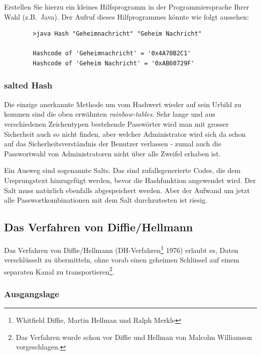 \begin{Exercise}[%
title={Hash-Code Berechnung},
label={exercise:hash-code}]

    Erstellen Sie hierzu ein kleines Hilfsprogramm in der Programmiersprache
    Ihrer Wahl (z.B.~Java). Der Aufruf dieses Hilfprogrammes könnte wie folgt aussehen:
    \begin{verbatim}
        >java Hash "Geheimnachricht" "Geheim Nachricht"

        Hashcode of 'Geheimnachricht' = '0x4A70B2C1'
        Hashcode of 'Geheim Nachricht' = '0xAB60729F'
    \end{verbatim}
\end{Exercise}


\subsubsection*{salted Hash}

Die einzige anerkannte Methode um vom Hashwert wieder auf sein Urbild
zu kommen sind die oben erwähnten \emph{rainbow-tables}. Sehr lange
und aus verschiedenen Zeichentypen bestehende Passwörter wird man
mit grosser Sicherheit auch so nicht finden, aber welcher Administrator
wird sich da schon auf das Sicherheitsverständnis der Benutzer
verlassen - zumal auch die Passwortwahl von Administratoren nicht
über alle Zweifel erhaben ist.

Ein Ausweg sind sogenannte Salts. Das sind zufallsgenerierte Codes,
die dem Ursprungstext hinzugefügt werden, bevor die Hashfunktion
angewendet wird. Der Salt muss natürlich ebenfalls abgespeichert
werden. Aber der Aufwand um jetzt alle Passwortkombinationen mit
dem Salt durchzutesten ist riesig.

\subsection{Das Verfahren von Diffie/Hellmann}
\label{subsec:diffie-hellmann}


Das Verfahren von Diffie/Hellmann (DH-Verfahren\footnote{Whitfield Diffie,
Martin Hellman und Ralph Merkle} 1976) erlaubt es, Daten verschlüsselt
zu übermitteln, ohne vorab einen geheimen Schlüssel auf einem separaten
Kanal zu transportieren\footnote{Das Verfahren wurde schon vor Diffie und
Hellman von Malcolm Williamson vorgeschlagen.}.

\subsubsection*{Ausgangslage}

